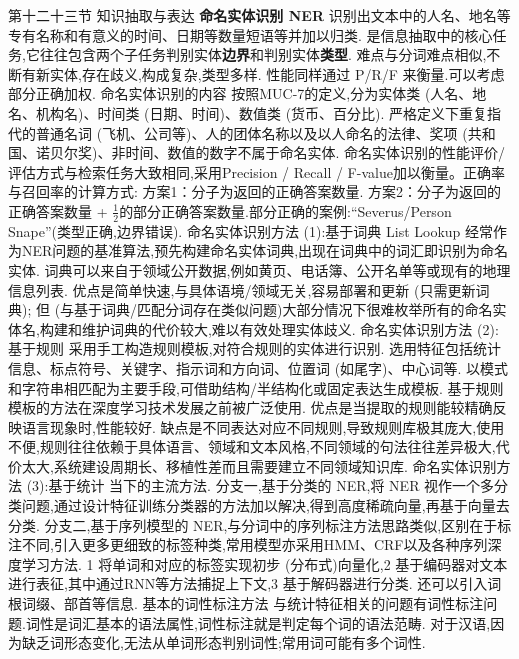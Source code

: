 \documentclass[10pt, utf8]{ctexart}
\begin{document}
\begin{multicols}{4}
    {\color{orange_}第十二十三节 知识抽取与表达}
    {\color{purple_}\textbf{命名实体识别 NER}}
    识别出文本中的人名、地名等专有名称和有意义的时间、日期等数量短语等并加以归类.
    是信息抽取中的核心任务,它往往包含两个子任务判别实体\textbf{边界}和判别实体\textbf{类型}.
    难点与分词难点相似,不断有新实体,存在歧义,构成复杂,类型多样.
    性能同样通过 P/R/F 来衡量.可以考虑部分正确加权.
    {\color{blue}命名实体识别的内容}
    按照MUC-7的定义,分为实体类 (人名、地名、机构名)、时间类 (日期、时间)、数值类 (货币、百分比).
    严格定义下重复指代的普通名词 (飞机、公司等)、人的团体名称以及以人命名的法律、奖项 (共和国、诺贝尔奖)、非时间、数值的数字不属于命名实体.
    {\color{blue}命名实体识别的性能评价/评估方式}与检索任务大致相同,采用Precision / Recall / F-value加以衡量。正确率与召回率的计算方式:
    方案1：分子为返回的正确答案数量.
    方案2：分子为返回的正确答案数量 + $\frac{1}{2}$的部分正确答案数量.部分正确的案例:“Severus/Person Snape”(类型正确,边界错误).
    {\color{blue}命名实体识别方法 (1):基于词典 List Lookup}
    经常作为NER问题的基准算法,预先构建命名实体词典,出现在词典中的词汇即识别为命名实体.
    词典可以来自于领域公开数据,例如黄页、电话簿、公开名单等或现有的地理信息列表.
    优点是简单快速,与具体语境/领域无关,容易部署和更新 (只需更新词典);
    但 (与基于词典/匹配分词存在类似问题)大部分情况下很难枚举所有的命名实体名,构建和维护词典的代价较大,难以有效处理实体歧义.
    {\color{blue}命名实体识别方法 (2):基于规则}
    采用手工构造规则模板,对符合规则的实体进行识别.
    选用特征包括统计信息、标点符号、关键字、指示词和方向词、位置词 (如尾字)、中心词等.
    以模式和字符串相匹配为主要手段,可借助结构/半结构化或固定表达生成模板.
    基于规则模板的方法在深度学习技术发展之前被广泛使用.
    优点是当提取的规则能较精确反映语言现象时,性能较好.
    缺点是不同表达对应不同规则,导致规则库极其庞大,使用不便,规则往往依赖于具体语言、领域和文本风格,不同领域的句法往往差异极大,代价太大,系统建设周期长、移植性差而且需要建立不同领域知识库.
    {\color{blue}命名实体识别方法 (3):基于统计}
    当下的主流方法.
    分支一,基于分类的 NER,将 NER 视作一个多分类问题,通过设计特征训练分类器的方法加以解决,得到高度稀疏向量,再基于向量去分类.
    分支二,基于序列模型的 NER,与分词中的序列标注方法思路类似,区别在于标注不同,引入更多更细致的标签种类,常用模型亦采用HMM、CRF以及各种序列深度学习方法.
    1 将单词和对应的标签实现初步 (分布式)向量化,2 基于编码器对文本进行表征,其中通过RNN等方法捕捉上下文,3 基于解码器进行分类.
    还可以引入词根词缀、部首等信息.
    {\color{blue}基本的词性标注方法}
    与统计特征相关的问题有词性标注问题.词性是词汇基本的语法属性,词性标注就是判定每个词的语法范畴.
    对于汉语,因为缺乏词形态变化,无法从单词形态判别词性;常用词可能有多个词性.

\end{multicols}
\end{document}
